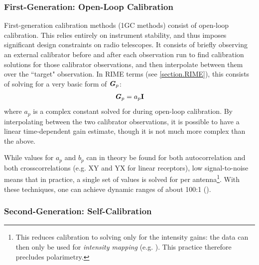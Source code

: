 \subsubsection{First-Generation: Open-Loop Calibration}\label{section.calibration.1gc}

\pg
First-generation calibration methods (1GC methods) consist of open-loop calibration. This relies entirely on instrument stability, and thus imposes significant design constraints on radio telescopes. It consists of briefly observing an external calibrator before and after each observation run to find calibration solutions for those calibrator observations, and then interpolate between them over the ``target" observation. %
In RIME terms (see \cref{section.RIME}), this consists of solving for a very basic form of $\textbf{\emph{G}}_p$:
\begin{equation}
\Gjones_p = a_p \bm{\mathrm{I}} %
\end{equation}
where $a_p$ is a complex constant solved for during open-loop calibration. By interpolating between the two calibrator observations, it is possible to have a linear time-dependent gain estimate, though it is not much more complex than the above. %

\pg
While values for $a_p$ and $b_p$ can in theory be found for both autocorrelation and both crosscorrelations (e.g. XY and YX for linear receptors), low signal-to-noise means that in practice, a single set of values is solved for per antenna\footnote{This reduces calibration to solving only for the intensity gains: the data can then only be used for \emph{intensity mapping} (e.g. ). This practice therefore precludes polarimetry.}. With these techniques, one can achieve dynamic ranges of about 100:1 ().

\subsubsection{Second-Generation: Self-Calibration}\label{section.calibration.2gc}


